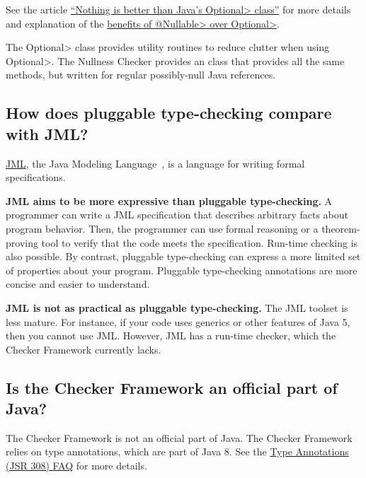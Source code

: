 See the article
\href{http://homes.cs.washington.edu/~mernst/advice/nothing-is-better-than-optional.html}{``Nothing
  is better than Java's \<Optional> class''} for more details and
explanation of the
\href{http://homes.cs.washington.edu/~mernst/advice/nothing-is-better-than-optional.html#benefits-of-nullable}{benefits of \<@Nullable> over \<Optional>}.

The \<Optional> class provides utility routines to reduce clutter when
using \<Optional>.  The Nullness Checker provides an
 class that provides all the same methods,
but written for regular possibly-null Java references.


\subsection{How does pluggable type-checking compare with JML?\label{faq-jml}}

\href{http://www.eecs.ucf.edu/~leavens/JML//index.shtml}{JML}, the Java Modeling
Language~\cite{LeavensBR2006:JML}, is a language for writing formal
specifications.

\textbf{JML aims to be more expressive than pluggable type-checking.}
A programmer can write a JML specification that
describes arbitrary facts about program behavior.  Then, the programmer can
use formal reasoning or a theorem-proving tool to verify that the code
meets the specification.  Run-time checking is also possible.
By contrast, pluggable type-checking can express a more limited set of
properties about your program.  Pluggable type-checking annotations are
more concise and easier to understand.

\textbf{JML is not as practical as pluggable type-checking.}
The JML toolset is less mature.  For instance, if your code uses
generics or other features of Java 5, then you cannot use JML.
However, JML has a run-time checker, which the Checker Framework currently
lacks.


\subsection{Is the Checker Framework an official part of Java?\label{faq-checker-framework-part-of-java}}

The Checker Framework is not an official part of Java.
The Checker Framework relies on
type annotations, which are part of Java 8.  See the
\href{https://checkerframework.org/jsr308/jsr308-faq.html#pluggable-type-checking-in-java}{Type
  Annotations (JSR 308) FAQ} for more details.


